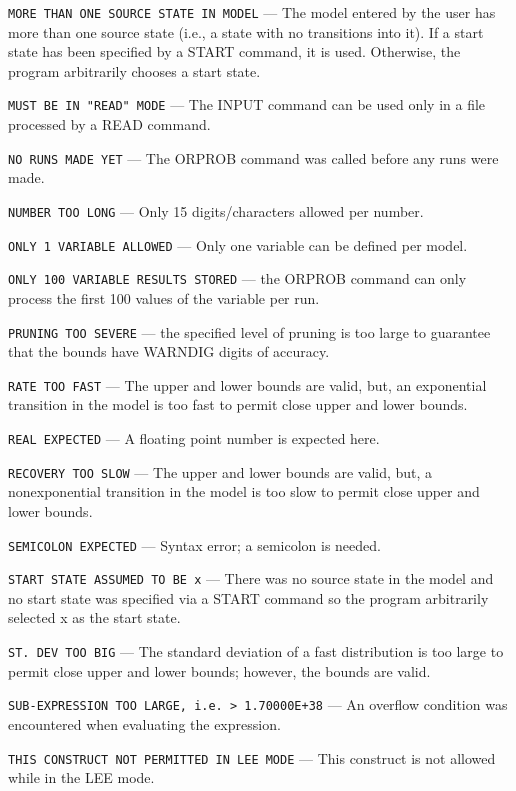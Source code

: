 \noindent \verb|MORE THAN ONE SOURCE STATE IN MODEL| --- 
The model entered by the user has more than one source state (i.e., a state
with no transitions into it).  If a start state has been specified by a START
command, it is used.  Otherwise, the program arbitrarily chooses a start
state.

\noindent \verb|MUST BE IN "READ" MODE| --- 
The INPUT command can be used only in a file processed by a READ command.

\noindent \verb|NO RUNS MADE YET| --- 
The ORPROB command was called before any runs were made.

\noindent \verb|NUMBER TOO LONG| --- 
Only 15 digits/characters allowed per number.

\noindent \verb|ONLY 1 VARIABLE ALLOWED| --- 
Only one variable can be defined per model.

\noindent \verb|ONLY 100 VARIABLE RESULTS STORED| --- 
the ORPROB command can only process the first 100 values of the 
variable per run.

\noindent \verb|PRUNING TOO SEVERE| --- 
the specified level of pruning is too large to guarantee that the bounds have
WARNDIG digits of accuracy.

\noindent \verb|RATE TOO FAST| --- 
The upper and lower bounds are valid, but, an exponential transition in the
model is too fast to permit close upper and lower bounds.

\noindent \verb|REAL EXPECTED| --- 
A floating point number is expected here.

\noindent \verb|RECOVERY TOO SLOW| --- 
The upper and lower bounds are valid, but, a nonexponential transition in the
model is too slow to permit close upper and lower bounds.

\noindent \verb|SEMICOLON EXPECTED| --- 
Syntax error; a semicolon is needed.

\noindent \verb|START STATE ASSUMED TO BE x| --- 
There was no source state in the model and no start state was specified via a 
START command so the program arbitrarily selected x as the start state.

\noindent \verb|ST. DEV TOO BIG| --- 
The standard deviation of a fast distribution is too
large to permit close upper and lower bounds; however, the bounds are valid.

\noindent \verb|SUB-EXPRESSION TOO LARGE, i.e. > 1.70000E+38| --- 
An overflow condition was  
encountered when evaluating the expression.

\noindent \verb|THIS CONSTRUCT NOT PERMITTED IN LEE MODE| --- 
This construct is not allowed 
while in the LEE mode.

